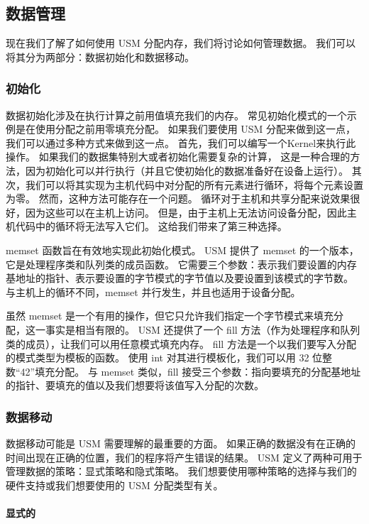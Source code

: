 \subsection{数据管理}
现在我们了解了如何使用 USM 分配内存，我们将讨论如何管理数据。 
我们可以将其分为两部分：数据初始化和数据移动。

\subsubsection{初始化}
数据初始化涉及在执行计算之前用值填充我们的内存。 常见初始化模式的一个示例是在使用分配之前用零填充分配。 
如果我们要使用 USM 分配来做到这一点，我们可以通过多种方式来做到这一点。 
首先，我们可以编写一个Kernel来执行此操作。 如果我们的数据集特别大或者初始化需要复杂的计算，
这是一种合理的方法，因为初始化可以并行执行（并且它使初始化的数据准备好在设备上运行）。 
其次，我们可以将其实现为主机代码中对分配的所有元素进行循环，将每个元素设置为零。 
然而，这种方法可能存在一个问题。 循环对于主机和共享分配来说效果很好，因为这些可以在主机上访问。 
但是，由于主机上无法访问设备分配，因此主机代码中的循环将无法写入它们。 这给我们带来了第三种选择。

memset 函数旨在有效地实现此初始化模式。 USM 提供了 memset 的一个版本，它是处理程序类和队列类的成员函数。 
它需要三个参数：表示我们要设置的内存基地址的指针、表示要设置的字节模式的字节值以及要设置到该模式的字节数。 
与主机上的循环不同，memset 并行发生，并且也适用于设备分配。

虽然 memset 是一个有用的操作，但它只允许我们指定一个字节模式来填充分配，这一事实是相当有限的。 
USM 还提供了一个 fill 方法（作为处理程序和队列类的成员），让我们可以用任意模式填充内存。 
fill 方法是一个以我们要写入分配的模式类型为模板的函数。 
使用 int 对其进行模板化，我们可以用 32 位整数“42”填充分配。 
与 memset 类似，fill 接受三个参数：指向要填充的分配基地址的指针、要填充的值以及我们想要将该值写入分配的次数。

\subsubsection{数据移动}
数据移动可能是 USM 需要理解的最重要的方面。 
如果正确的数据没有在正确的时间出现在正确的位置，我们的程序将产生错误的结果。 
USM 定义了两种可用于管理数据的策略：显式策略和隐式策略。 
我们想要使用哪种策略的选择与我们的硬件支持或我们想要使用的 USM 分配类型有关。

\paragraph{显式的}

